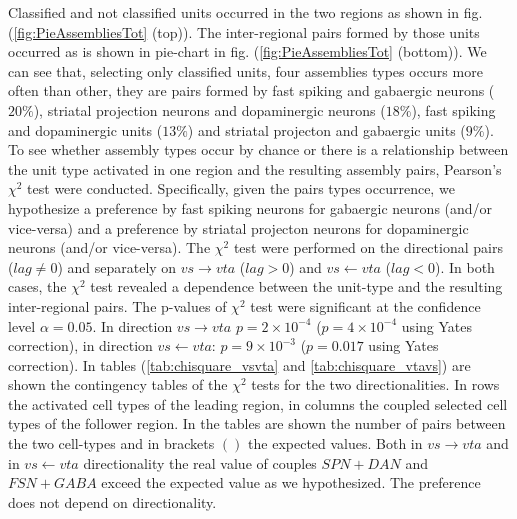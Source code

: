 Classified and not classified units occurred in the two regions as shown in fig. (\ref{fig:PieAssembliesTot} (top)). The inter-regional pairs formed by those units occurred as is shown in pie-chart in fig. (\ref{fig:PieAssembliesTot} (bottom)). We can see that, selecting only classified units, four assemblies types occurs more often than other, they are pairs formed by fast spiking and gabaergic neurons ($20\%$), striatal projection neurons and dopaminergic neurons ($18\%$), fast spiking and dopaminergic units ($13\%$) and striatal projecton and gabaergic units ($9\%$). To see whether assembly types occur by chance or there is a relationship between the unit type activated in one region and the resulting assembly pairs, Pearson's $\chi^2$ test were conducted. Specifically, given the pairs types occurrence, we hypothesize a preference by fast spiking neurons for gabaergic neurons (and/or vice-versa) and a preference by striatal projecton neurons for dopaminergic neurons (and/or vice-versa). The $\chi^2$ test were performed on the directional pairs ($lag\neq0$) and separately on $vs\rightarrow vta$ ($lag>0$) and $vs \leftarrow vta$ ($lag<0$). In both cases, the $\chi^2$ test revealed a dependence between the unit-type and the resulting inter-regional pairs. The p-values of $\chi^2$ test were significant at the confidence level $\alpha = 0.05$. In direction $vs\rightarrow vta$ $p=2\times10^{-4}$ ($p=4\times10^{-4}$ using Yates correction), in direction $vs \leftarrow vta$: $p=9\times10^{-3}$ ($p=0.017$ using Yates correction). In tables (\ref{tab:chisquare_vsvta} and \ref{tab:chisquare_vtavs}) are shown the contingency tables of the $\chi^2$ tests for the two directionalities. In rows the activated cell types of the leading region, in columns the coupled selected cell types of the follower region. In the tables are shown the number of pairs between the two cell-types and in brackets $()$ the expected values. Both in $vs\rightarrow vta$ and in $vs\leftarrow vta$ directionality the real value of couples $SPN+DAN$ and $FSN+GABA$ exceed the expected value as we hypothesized. The preference does not depend on directionality.
